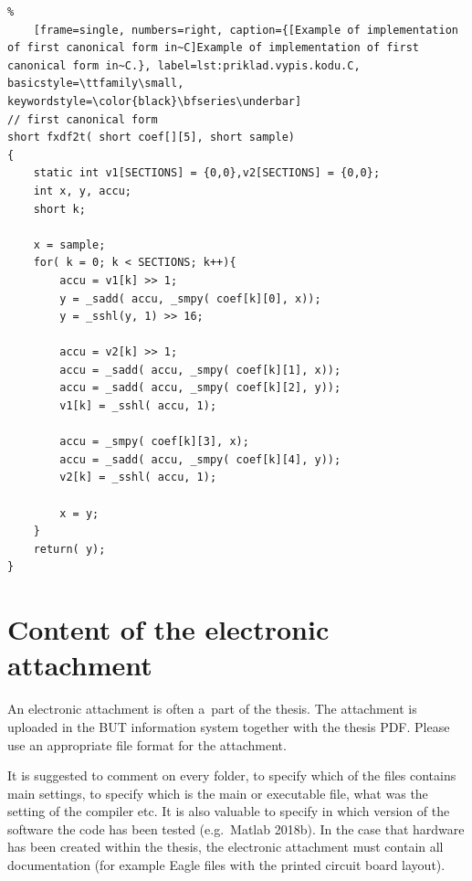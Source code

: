 \noindent
\begin{minipage}{\linewidth}



\begin{lstlisting}%
	[frame=single, numbers=right, caption={[Example of implementation of first canonical form in~C]Example of implementation of first canonical form in~C.}, label=lst:priklad.vypis.kodu.C, basicstyle=\ttfamily\small, keywordstyle=\color{black}\bfseries\underbar]
// first canonical form
short fxdf2t( short coef[][5], short sample)
{
	static int v1[SECTIONS] = {0,0},v2[SECTIONS] = {0,0};
	int x, y, accu;
	short k;

	x = sample;
	for( k = 0; k < SECTIONS; k++){
		accu = v1[k] >> 1;
		y = _sadd( accu, _smpy( coef[k][0], x));
		y = _sshl(y, 1) >> 16;

		accu = v2[k] >> 1;
		accu = _sadd( accu, _smpy( coef[k][1], x));
		accu = _sadd( accu, _smpy( coef[k][2], y));
		v1[k] = _sshl( accu, 1);

		accu = _smpy( coef[k][3], x);
		accu = _sadd( accu, _smpy( coef[k][4], y));
		v2[k] = _sshl( accu, 1);

		x = y;
	}
	return( y);
}
\end{lstlisting}
\end{minipage}







\chapter{Content of the electronic attachment}
An electronic attachment is often a~part of the thesis.
The attachment is uploaded in the BUT information system together with the thesis PDF.
Please use an appropriate file format for the attachment.

It is suggested to comment on every folder, to specify which of the files contains main settings,
to specify which is the main or executable file, what was the setting of the compiler etc.
It is also valuable to specify in which version of the software the code has been tested (e.g.\ Matlab 2018b).
In the case that hardware has been created within the thesis, the electronic attachment must contain all documentation
(for example Eagle files with the printed circuit board layout).

